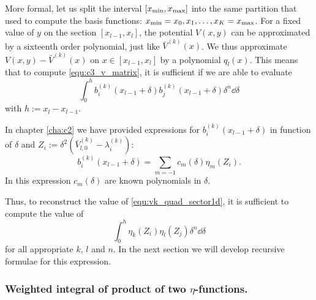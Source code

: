 More formal, let us split the interval $[{x_{\text{min}}}, {x_{\text{max}}}]$ into the same partition that  used to compute the basis functions: ${x_{\text{min}}} = x_0, x_1, \dots, x_K = {x_{\text{max}}}$. For a fixed value of $y$ on the section $[x_{l-1}, x_l]$, the potential $V(x, y)$ can be approximated by a sixteenth order polynomial, just like $\bar{V}^{(k)}(x)$. We thus approximate $V(x, y) - \bar{V}^{(k)}(x)$ on $x \in [x_{l-1}, x_l]$ by a polynomial $q_l(x)$. This means that to compute \eqref{equ:c3_v_matrix}, it is sufficient if we are able to evaluate
\begin{equation}\label{equ:vk_quad_sector1d}
  \int_{0}^{h} b_i^{(k)}(x_{l-1}+\delta)b_j^{(k)}(x_{l-1}+\delta)\delta^n\dd \delta
\end{equation}
with $h := x_l-x_{l-1}$.

In chapter \ref{cha:c2} we have provided expressions for $b_i^{(k)}(x_{l-1}+\delta)$ in function of $\delta$ and $Z_i := \delta^2\left(\bar{V}^{(k)}_{l,0}- \lambda^{(k)}_i\right)$:
$$
  b_i^{(k)}(x_{l-1}+\delta) = \sum_{m=-1} c_m(\delta) \eta_m(Z_i)\text{.}
$$
In this expression $c_m(\delta)$ are known polynomials in $\delta$.

Thus, to reconstruct the value of \eqref{equ:vk_quad_sector1d}, it is sufficient to compute the value of
\begin{equation}\label{equ:c3_eta_eta_inegral}
  \int_0^h \eta_k(Z_i) \eta_l(Z_j) \delta^n \dd \delta
\end{equation}
for all appropriate $k$, $l$ and $n$. In the next section we will develop recursive formulae for this expression.

\subsubsection{Weighted integral of product of two \texorpdfstring{$\eta$}{eta}-functions.}

